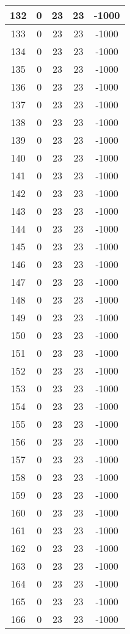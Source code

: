 \documentclass[letterpaper, 12pt]{article}
\begin{document}
\begin{longtable}{|c|c|c|c|c|}
\hline
132 & 0 & 23 & 23 & -1000 \\
\hline
133 & 0 & 23 & 23 & -1000 \\
\hline
134 & 0 & 23 & 23 & -1000 \\
\hline
135 & 0 & 23 & 23 & -1000 \\
\hline
136 & 0 & 23 & 23 & -1000 \\
\hline
137 & 0 & 23 & 23 & -1000 \\
\hline
138 & 0 & 23 & 23 & -1000 \\
\hline
139 & 0 & 23 & 23 & -1000 \\
\hline
140 & 0 & 23 & 23 & -1000 \\
\hline
141 & 0 & 23 & 23 & -1000 \\
\hline
142 & 0 & 23 & 23 & -1000 \\
\hline
143 & 0 & 23 & 23 & -1000 \\
\hline
144 & 0 & 23 & 23 & -1000 \\
\hline
145 & 0 & 23 & 23 & -1000 \\
\hline
146 & 0 & 23 & 23 & -1000 \\
\hline
147 & 0 & 23 & 23 & -1000 \\
\hline
148 & 0 & 23 & 23 & -1000 \\
\hline
149 & 0 & 23 & 23 & -1000 \\
\hline
150 & 0 & 23 & 23 & -1000 \\
\hline
151 & 0 & 23 & 23 & -1000 \\
\hline
152 & 0 & 23 & 23 & -1000 \\
\hline
153 & 0 & 23 & 23 & -1000 \\
\hline
154 & 0 & 23 & 23 & -1000 \\
\hline
155 & 0 & 23 & 23 & -1000 \\
\hline
156 & 0 & 23 & 23 & -1000 \\
\hline
157 & 0 & 23 & 23 & -1000 \\
\hline
158 & 0 & 23 & 23 & -1000 \\
\hline
159 & 0 & 23 & 23 & -1000 \\
\hline
160 & 0 & 23 & 23 & -1000 \\
\hline
161 & 0 & 23 & 23 & -1000 \\
\hline
162 & 0 & 23 & 23 & -1000 \\
\hline
163 & 0 & 23 & 23 & -1000 \\
\hline
164 & 0 & 23 & 23 & -1000 \\
\hline
165 & 0 & 23 & 23 & -1000 \\
\hline
166 & 0 & 23 & 23 & -1000 \\

\end{longtable}
\end{document}
